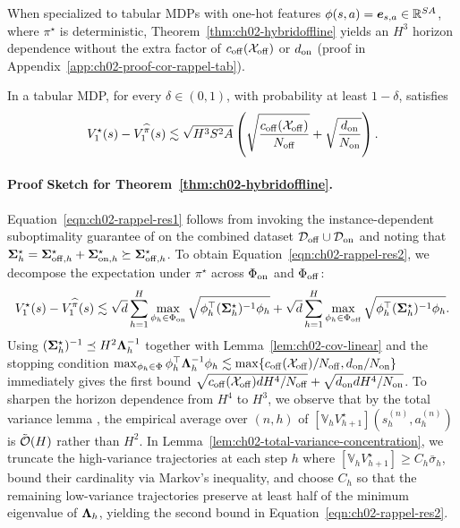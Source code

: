 When specialized to tabular MDPs with one-hot features $\phi(s,a) = {\bm{e}}_{s,a} \in {\mathbb{R}}^{S A}$, where $\pi^\star$ is deterministic, Theorem~\ref{thm:ch02-hybridoffline} yields an $H^3$ horizon dependence without the extra factor of $c_{{\operatorname{off}}}({\mathcal{X}}_{{\operatorname{off}}})$ or $d_{{\operatorname{on}}}$ (proof in Appendix~\ref{app:ch02-proof-cor-rappel-tab}).

\begin{cor}
\label{cor:ch02-rappel-tabular}
In a tabular MDP, for every $\delta\in (0,1)$, with probability at least $1-\delta$,  satisfies
\begin{equation}
    V_1^{\star}(s) - V_1^{\widehat{\pi}}(s) \lesssim \sqrt{H^3 S^2 A}\left(\sqrt{\frac{c_{{\operatorname{off}}}({\mathcal{X}}_{{\operatorname{off}}})}{N_{{\operatorname{off}}}}} + \sqrt{\frac{d_{{\operatorname{on}}}}{N_{{\operatorname{on}}}}}\right).
\end{equation}
\end{cor}

\paragraph{Proof Sketch for Theorem~\ref{thm:ch02-hybridoffline}.}
Equation~\eqref{eqn:ch02-rappel-res1} follows from invoking the instance-dependent suboptimality guarantee of \citet[Theorem 2]{xiong2023nearly} on the combined dataset ${\mathcal{D}}_{{\operatorname{off}}} \cup {\mathcal{D}}_{{\operatorname{on}}}$ and noting that ${\bm{\Sigma}}^\star_h = {\bm{\Sigma}}^\star_{{\operatorname{off}}, h} + {\bm{\Sigma}}^\star_{{\operatorname{on}}, h} \succeq {\bm{\Sigma}}^\star_{{\operatorname{off}}, h}$. To obtain Equation~\eqref{eqn:ch02-rappel-res2}, we decompose the expectation under $\pi^\star$ across $\Phi_{{\operatorname{on}}}$ and $\Phi_{{\operatorname{off}}}$:
\begin{equation}
    V_1^\star(s)-V_1^{\widehat{\pi}}(s) \lesssim \sqrt{d} \sum_{h=1}^H \max_{\phi_h \in \Phi_{{\operatorname{on}}}} \sqrt{\phi_h^{\top}(\boldsymbol{\Sigma}_h^{\star})^{-1}\phi_h} + \sqrt{d} \sum_{h=1}^H  \max_{\phi_h \in \Phi_{{\operatorname{off}}}}\sqrt{ \phi_h^{\top}(\boldsymbol{\Sigma}_h^{\star})^{-1}\phi_h}.
\end{equation}
Using $({\bm{\Sigma}}^\star_h)^{-1} \preceq H^2 {\bm{\Lambda}}_h^{-1}$ together with Lemma~\ref{lem:ch02-cov-linear} and the stopping condition $\max_{\phi_h \in \Phi} \phi_h^\top {\bm{\Lambda}}_h^{-1} \phi_h \lesssim \max\{c_{{\operatorname{off}}}({\mathcal{X}}_{{\operatorname{off}}})/N_{{\operatorname{off}}}, d_{{\operatorname{on}}}/N_{{\operatorname{on}}}\}$ immediately gives the first bound $\sqrt{c_{{\operatorname{off}}}({\mathcal{X}}_{{\operatorname{off}}}) d H^4 / N_{{\operatorname{off}}}} + \sqrt{d_{{\operatorname{on}}} d H^4 / N_{{\operatorname{on}}}}$. To sharpen the horizon dependence from $H^4$ to $H^3$, we observe that by the total variance lemma \citep[Lemma C.5]{jin2018q}, the empirical average over $(n, h)$ of $[\mathbb{V}_h V^\star_{h+1}](s_h^{(n)}, a_h^{(n)})$ is $\tilde{{\mathcal{O}}}(H)$ rather than $H^2$. In Lemma~\ref{lem:ch02-total-variance-concentration}, we truncate the high-variance trajectories at each step $h$ where $[\mathbb{V}_h V^\star_{h+1}] \geq C_h \bar{\sigma}_h$, bound their cardinality via Markov's inequality, and choose $C_h$ so that the remaining low-variance trajectories preserve at least half of the minimum eigenvalue of ${\bm{\Lambda}}_h$, yielding the second bound in Equation~\eqref{eqn:ch02-rappel-res2}.

